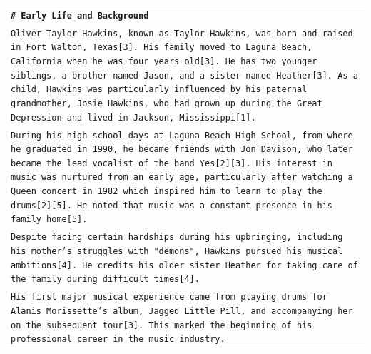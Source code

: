 \documentclass[11pt]{article}
\begin{document}
\begin{longtable}{p{\textwidth}}
\vspace{1pt}
\texttt{\small{\textbf{\# Early Life and Background}}} \\
\texttt{\small{Oliver Taylor Hawkins, known as Taylor Hawkins, was born and raised in Fort Walton, Texas[3]. His family moved to Laguna Beach, California when he was four years old[3]. He has two younger siblings, a brother named Jason, and a sister named Heather[3]. As a child, Hawkins was particularly influenced by his paternal grandmother, Josie Hawkins, who had grown up during the Great Depression and lived in Jackson, Mississippi[1].}} \\
\texttt{\small{During his high school days at Laguna Beach High School, from where he graduated in 1990, he became friends with Jon Davison, who later became the lead vocalist of the band Yes[2][3]. His interest in music was nurtured from an early age, particularly after watching a Queen concert in 1982 which inspired him to learn to play the drums[2][5]. He noted that music was a constant presence in his family home[5].}} \\
\texttt{\small{Despite facing certain hardships during his upbringing, including his mother's struggles with "demons", Hawkins pursued his musical ambitions[4]. He credits his older sister Heather for taking care of the family during difficult times[4].}} \\
\texttt{\small{His first major musical experience came from playing drums for Alanis Morissette's album, Jagged Little Pill, and accompanying her on the subsequent tour[3]. This marked the beginning of his professional career in the music industry.}} \\


\end{longtable}
\end{document}
